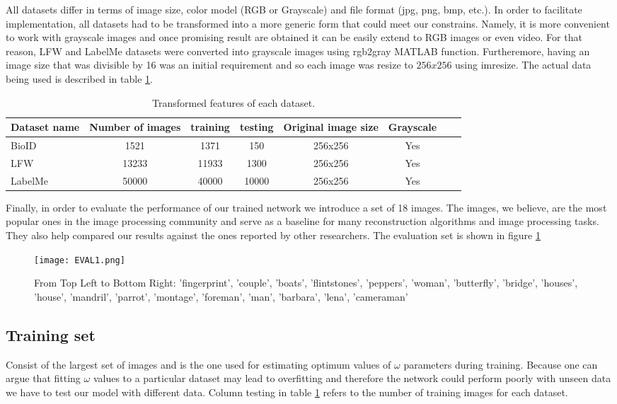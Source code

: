 All datasets differ in terms of image size, color model (RGB or Grayscale) and file format (jpg, png, bmp, etc.). In order to facilitate implementation, all datasets had to be transformed into a more generic form that could meet our constrains. Namely, it is more convenient to work with grayscale images and once promising result are obtained it can be easily extend to RGB images or even video. For that reason, LFW and LabelMe datasets were converted into grayscale images using rgb2gray MATLAB function. Furtheremore, having an image size that was divisible by 16 was an initial requirement and so each image was resize to $256x256$ using imresize. The actual data being used is described in table \ref{tab:datasets2}.   
\begin{table}[tb]
\caption[Transformed datasets for training and testing]{Transformed features of each dataset.}
\label{tab:datasets2}
\centering
\begin{tabular}{l*{6}{c}r}
Dataset name              & Number of images & training & testing &  Original image size& Grayscale \\
\hline
BioID   & 1521 & 1371 & 150 & 256x256 & Yes\\
LFW     & 13233 & 11933 & 1300 & 256x256 & Yes\\
LabelMe & 50000 & 40000 & 10000 & 256x256 & Yes\\
\bottomrule 
\end{tabular}  
\end{table}

Finally, in order to evaluate the performance of our trained network we introduce a set of 18 images. The images, we believe, are the most popular ones in the image processing community and serve as a baseline for many reconstruction algorithms and image processing tasks. They also help compared our results against the ones reported by other researchers. The evaluation set is shown in figure \ref{fig:EVALim1}
\begin{figure}[tb] 
\centering 
\texttt{[image: EVAL1.png]} 
\caption[Evaluation images]{From Top Left to Bottom Right: 'fingerprint', 'couple', 'boats', 'flintstones', 'peppers', 'woman', 'butterfly', 'bridge', 'houses', 'house', 'mandril', 'parrot', 'montage', 'foreman', 'man', 'barbara', 'lena', 'cameraman'}
\label{fig:EVALim1} 
\end{figure}

\subsection{Training set}
Consist of the largest set of images and is the one used for estimating optimum values of $\omega$ parameters during training. Because one can argue that fitting $\omega$ values to a particular dataset may lead to overfitting and therefore the network could perform poorly with unseen data we have to test our model with different data. Column testing in table \ref{tab:datasets2} refers to the number of training images for each dataset.

